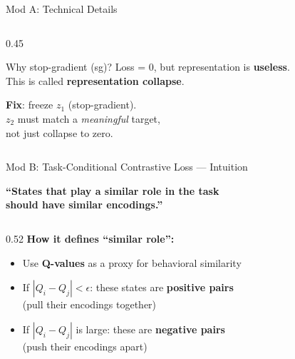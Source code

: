 \documentclass[aspectratio=169]{beamer}
\newcommand{\highlight}[1]{\textcolor{AccentOrange}{\textbf{#1}}}
\newcommand{\good}[1]{\textcolor{SuccessGreen}{\textbf{#1}}}
\newcommand{\bad}[1]{\textcolor{DangerRed}{\textbf{#1}}}
\begin{document}
\begin{frame}{Mod A: Technical Details}
\begin{columns}[T]
\begin{column}{0.45\textwidth}
\begin{alertblock}{Why stop-gradient (sg)?}
Loss = 0, but representation is \bad{useless}.\\
This is called \highlight{representation collapse}.

\vspace{0.2em}
\good{Fix}: freeze $z_1$ (stop-gradient).\\
$z_2$ must match a \emph{meaningful} target,\\not just collapse to zero.
\end{alertblock}
\end{column}
\end{columns}
\end{frame}

\begin{frame}{Mod B: Task-Conditional Contrastive Loss --- Intuition}

\begin{center}
\large\color{UofTBlue}
\textbf{``States that play a similar role in the task\\should have similar encodings.''}
\end{center}

\vspace{0.3em}
\small
\begin{columns}[T]
\begin{column}{0.52\textwidth}
\textbf{How it defines ``similar role'':}
\begin{itemize}\setlength{\itemsep}{3pt}
    \item Use \highlight{Q-values} as a proxy for behavioral similarity
    \item If $|Q_i - Q_j| < \epsilon$: these states are \good{positive pairs}\\(pull their encodings together)
    \item If $|Q_i - Q_j|$ is large: these are \bad{negative pairs}\\(push their encodings apart)
\end{itemize}


\end{column}
\end{columns}
\end{frame}
\end{document}
